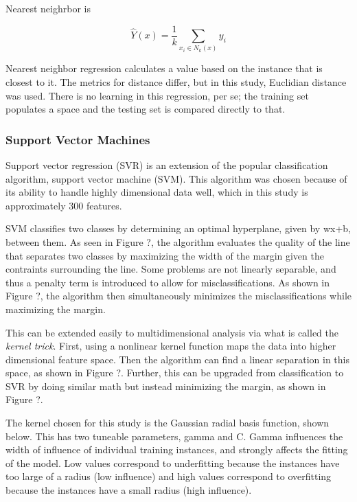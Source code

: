 Nearest neighrbor is 



\begin{equation}
\hat{Y}(x) = \frac{1}{k} \sum_{x_i \in N_k(x)} y_i
\end{equation}

Nearest neighbor regression calculates a value based on the instance that is
closest to it. The metrics for distance differ, but in this study, Euclidian
distance was used. There is no learning in this regression, per se; the
training set populates a space and the testing set is compared directly to
that. \cite{elements_stats} 


\subsubsection{Support Vector Machines}
\label{sec:svm}


Support vector regression (SVR) is an extension of the popular classification
algorithm, support vector machine (SVM).  This algorithm was chosen because of
its ability to handle highly dimensional data well, which in this study is
approximately 300 features. 

SVM classifies two classes by determining an optimal hyperplane, given by wx+b,
between them.  As seen in Figure ?, the algorithm evaluates the quality of the
line that separates two classes by maximizing the width of the margin given the
contraints surrounding the line.  Some problems are not linearly separable, and
thus a penalty term is introduced to allow for misclassifications. As shown in
Figure ?, the algorithm then simultaneously minimizes the misclassifications
while maximizing the margin. 

This can be extended easily to multidimensional analysis via what is called the
\textit{kernel trick}.  First, using a nonlinear kernel function maps the data
into higher dimensional feature space. Then the algorithm can find a linear
separation in this space, as shown in Figure ?. Further, this can be upgraded
from classification to SVR by doing similar math but instead minimizing the
margin, as shown in Figure ?. 

The kernel chosen for this study is the Gaussian radial basis function, shown
below. This has two tuneable parameters, gamma and C. Gamma influences the
width of influence of individual training instances, and strongly affects the
fitting of the model. Low values correspond to underfitting because the
instances have too large of a radius (low influence) and high values correspond
to overfitting because the instances have a small radius (high influence). 

